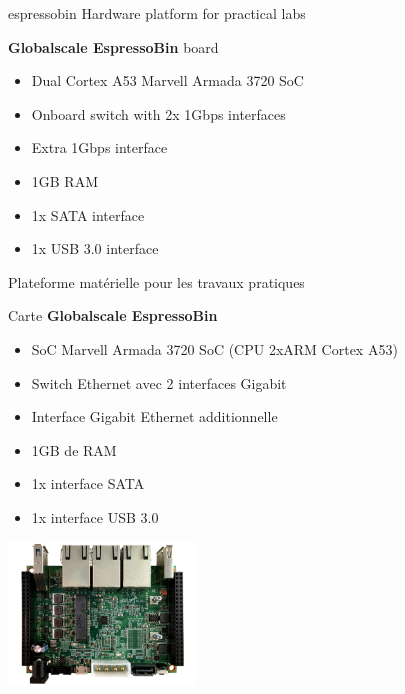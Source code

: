 {espressobin}
{Hardware platform for practical labs}
{
  {\bf Globalscale EspressoBin} board
  \begin{itemize}
  \item Dual Cortex A53 Marvell Armada 3720 SoC
  \item Onboard switch with 2x 1Gbps interfaces
  \item Extra 1Gbps interface
  \item 1GB RAM
  \item 1x SATA interface
  \item 1x USB 3.0 interface
  \end{itemize}
}
{Plateforme matérielle pour les travaux pratiques}
{
  Carte {\bf Globalscale EspressoBin}
  \begin{itemize}
  \item SoC Marvell Armada 3720 SoC (CPU 2xARM Cortex A53)
  \item Switch Ethernet avec 2 interfaces Gigabit
  \item Interface Gigabit Ethernet additionnelle
  \item 1GB de RAM
  \item 1x interface SATA
  \item 1x interface USB 3.0
  \end{itemize}
}
{
  \begin{center}
    \includegraphics[width=5cm]{../slides/espressobin/espressobin.png}
  \end{center}
}
